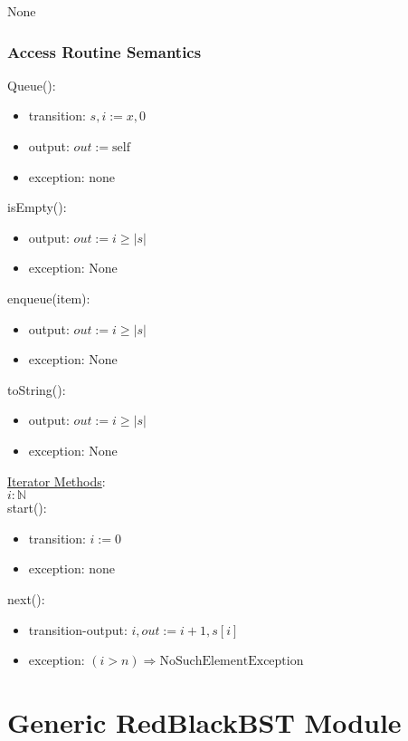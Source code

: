\documentclass[12pt]{article}
\begin{document}
None

\subsubsection* {Access Routine Semantics}

\noindent Queue():
\begin{itemize}
\item transition: $s, i := x, 0$
\item output: $out := \mbox{self}$
\item exception: none
\end{itemize}

\noindent isEmpty():
\begin{itemize}
\item output: $out := i \geq |s|$
\item exception: None
\end{itemize}

\noindent enqueue(item):
\begin{itemize}
\item output: $out := i \geq |s|$
\item exception: None
\end{itemize}

\noindent toString():
\begin{itemize}
\item output: $out := i \geq |s|$
\item exception: None
\end{itemize}

\medskip

\noindent \underline{Iterator Methods}:\\

$i: \mathbb{N}$\\

\noindent start():
\begin{itemize}
\item transition: $i := 0$
\item exception: none
\end{itemize}

\noindent next():
\begin{itemize}
\item transition-output: $i, out := i + 1, s[i]$
\item exception: $( i > n) \Rightarrow \text{NoSuchElementException}$
\end{itemize}

\newpage

\section* {Generic RedBlackBST Module}
\end{document}
